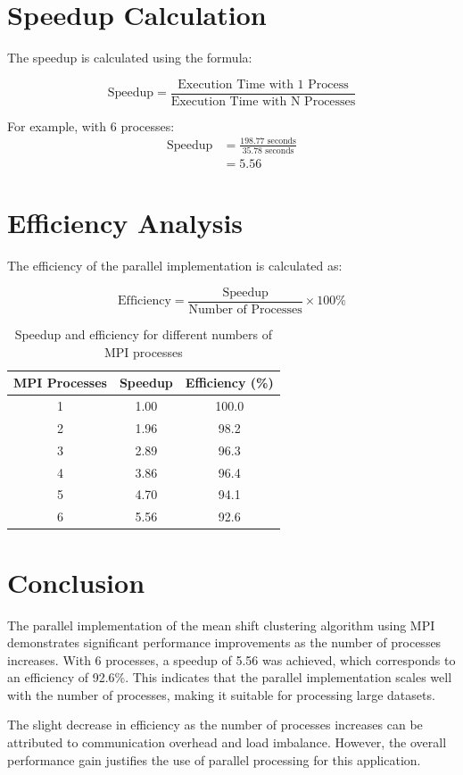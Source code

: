 \documentclass{article}
\begin{document}
\section{Speedup Calculation}
The speedup is calculated using the formula:

\begin{equation}
\text{Speedup} = \frac{\text{Execution Time with 1 Process}}{\text{Execution Time with N Processes}}
\end{equation}

For example, with 6 processes:
\begin{align*}
\text{Speedup} &= \frac{198.77 \text{ seconds}}{35.78 \text{ seconds}} \\
&= 5.56
\end{align*}

\section{Efficiency Analysis}
The efficiency of the parallel implementation is calculated as:

\begin{equation}
\text{Efficiency} = \frac{\text{Speedup}}{\text{Number of Processes}} \times 100\%
\end{equation}

\begin{table}[H]
\centering
\begin{tabular}{|c|c|c|}
\hline
\textbf{MPI Processes} & \textbf{Speedup} & \textbf{Efficiency (\%)} \\
\hline
1 & 1.00 & 100.0 \\
2 & 1.96 & 98.2 \\
3 & 2.89 & 96.3 \\
4 & 3.86 & 96.4 \\
5 & 4.70 & 94.1 \\
6 & 5.56 & 92.6 \\
\hline
\end{tabular}
\caption{Speedup and efficiency for different numbers of MPI processes}
\end{table}

\section{Conclusion}
The parallel implementation of the mean shift clustering algorithm using MPI demonstrates significant performance improvements as the number of processes increases. With 6 processes, a speedup of 5.56 was achieved, which corresponds to an efficiency of 92.6\%. This indicates that the parallel implementation scales well with the number of processes, making it suitable for processing large datasets.

The slight decrease in efficiency as the number of processes increases can be attributed to communication overhead and load imbalance. However, the overall performance gain justifies the use of parallel processing for this application.
\end{document}
